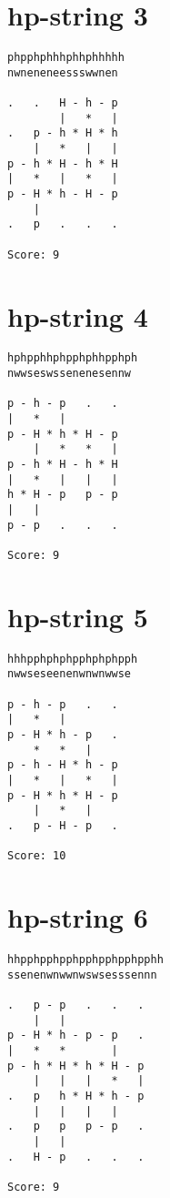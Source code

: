 \documentclass[a4paper,oneside,article,11pt]{memoir}
\begin{document}
\section*{hp-string 3}
\begin{lstlisting}[basicstyle=\ttfamily]
phpphphhhphhphhhhh
nwneneneessswwnen

.   .   H - h - p  
        |   *   |  
.   p - h * H * h  
    |   *   |   |  
p - h * H - h * H  
|   *   |   *   |  
p - H * h - H - p  
    |              
.   p   .   .   .  
                   
Score: 9
\end{lstlisting}
\clearpage
\section*{hp-string 4}
\begin{lstlisting}[basicstyle=\ttfamily]
hphpphhphpphphhpphph
nwwseswssenenesennw

p - h - p   .   .  
|   *   |          
p - H * h * H - p  
    |   *   *   |  
p - h * H - h * H  
|   *   |   |   |  
h * H - p   p - p  
|   |              
p - p   .   .   .  
                   
Score: 9
\end{lstlisting}

\pagebreak

\section*{hp-string 5}
\begin{lstlisting}[basicstyle=\ttfamily]
hhhpphphphpphphphpph
nwwseseenenwnwnwwse

p - h - p   .   .  
|   *   |          
p - H * h - p   .  
    *   *   |      
p - h - H * h - p  
|   *   |   *   |  
p - H * h * H - p  
    |   *   |      
.   p - H - p   .  
                   
Score: 10
\end{lstlisting}

\section*{hp-string 6}
\begin{lstlisting}[basicstyle=\ttfamily]
hhpphpphpphpphpphpphpphh
ssenenwnwwnwswsesssennn

.   p - p   .   .   .  
    |   |              
p - H * h - p - p   .  
|   *   *       |      
p - h * H * h * H - p  
    |   |   |   *   |  
.   p   h * H * h - p  
    |   |   |   |      
.   p   p   p - p   .  
    |   |              
.   H - p   .   .   .  
                       
Score: 9
\end{lstlisting}
\end{document}
